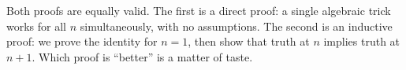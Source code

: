 \begin{remark}
Both proofs are equally valid.  The first is a direct proof: a single algebraic trick works for all $n$ simultaneously, with no assumptions.  The second is an inductive proof: we prove the identity for $n = 1$, then show that truth at $n$ implies truth at $n + 1$.  Which proof is ``better'' is a matter of taste.
\end{remark}
